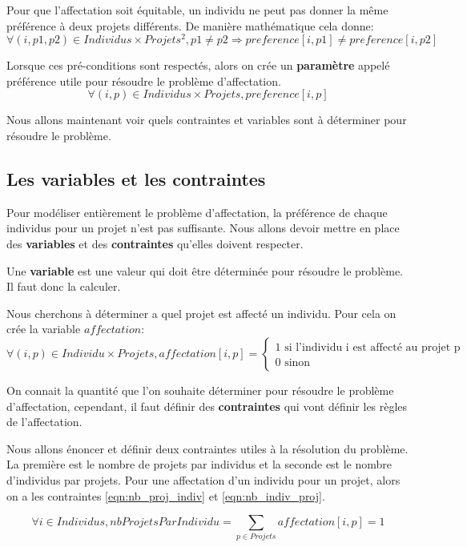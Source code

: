 \documentclass[final,poster]{polytech/polytech}
\begin{document}
Pour que l'affectation soit équitable, un individu ne peut pas donner la même préférence à deux projets différents. De manière mathématique cela donne:
$$
\forall (i,p1,p2) \in Individus \times Projets^2 , p1 \neq p2 \Rightarrow preference[i,p1] \neq preference[i,p2]
$$

Lorsque ces pré-conditions sont respectés, alors on crée un \textbf{paramètre} appelé préférence utile pour résoudre le problème d'affectation.
$$
\forall (i,p) \in Individus \times Projets,
preference[i,p]
$$

Nous allons maintenant voir quels contraintes et variables sont à déterminer pour résoudre le problème.

\subsection{Les variables et les contraintes}

Pour modéliser entièrement le problème d'affectation, la préférence de chaque individus pour un projet n'est pas suffisante.
Nous allons devoir mettre en place des \textbf{ variables} et des \textbf{contraintes} qu'elles doivent respecter.

Une \textbf{variable} est une valeur qui doit être déterminée pour résoudre le problème. Il faut donc la calculer.

Nous cherchons à déterminer a quel projet est affecté un individu. Pour cela on crée la variable $affectation$:
$$
\forall (i,p) \in Individu\times Projets , affectation[i,p]=
\left\lbrace
\begin{array}{l}
1 \text{ si l'individu i est affecté au projet p} \\
0 \text{ sinon}
\end{array}
\right.
$$

On connait la quantité que l'on souhaite déterminer pour résoudre le problème d'affectation, cependant, il faut définir des \textbf{contraintes} qui vont définir les règles de l'affectation.

Nous allons énoncer et définir deux contraintes utiles à la résolution du problème. La première est le nombre de projets par individus et la seconde est le nombre d'individus par projets.
Pour une affectation d'un individu pour un projet, alors on a les contraintes \eqref{eqn:nb_proj_indiv} et \eqref{eqn:nb_indiv_proj}.

\begin{equation}
\label{eqn:nb_proj_indiv}
\forall i \in Individus, nbProjetsParIndividu= \sum_{p \in Projets} affectation[i,p] = 1
\end{equation}
\end{document}
